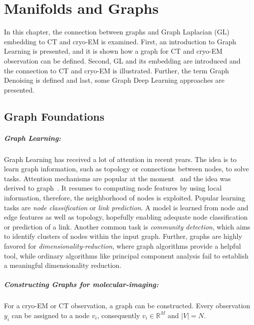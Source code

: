 \chapter{Manifolds and Graphs}
\label{sec:manifold_and_graphs}
    
In this chapter, the connection between graphs and Graph Laplacian (GL) embedding to 
CT and cryo-EM is examined. 
First, an introduction to Graph Learning is presented, and it is shown how a graph
for CT and cryo-EM observation can be defined.
Second, GL and its embedding are introduced and the connection to CT and cryo-EM is illustrated.
Further, the term Graph Denoising is defined and last, some Graph Deep Learning approaches are presented.


\section{Graph Foundations}

\paragraph{Graph Learning:} 
Graph Learning has received a lot of attention in recent years.
The idea is to learn graph information, such as topology or connections between nodes, to solve tasks.
Attention mechanisms are popular at the moment~\cite{transformer} and the idea was derived to graph~\cite{GAT}.
It resumes to computing node features by using local information, therefore, the neighborhood of nodes is exploited.
Popular learning tasks are \textit{node classification} or \textit{link prediction}. 
A model is learned from node and edge features as well as topology, hopefully enabling adequate node classification
or prediction of a link.
Another common task is \textit{community detection}, which aims to identify clusters of nodes within the input graph.
Further, graphs are highly favored for \textit{dimensionality-reduction}, where 
graph algorithms provide a helpful tool, while ordinary algorithms like principal component analysis fail to 
establish a meaningful dimensionality reduction.


\paragraph{Constructing Graphs for molecular-imaging:}
For a cryo-EM or CT observation, a graph can be constructed.
Every observation $y_i$ can be assigned to a node $v_i$, consequently $v_i \in \mathbb{R}^M$ and $|V|=N$.

